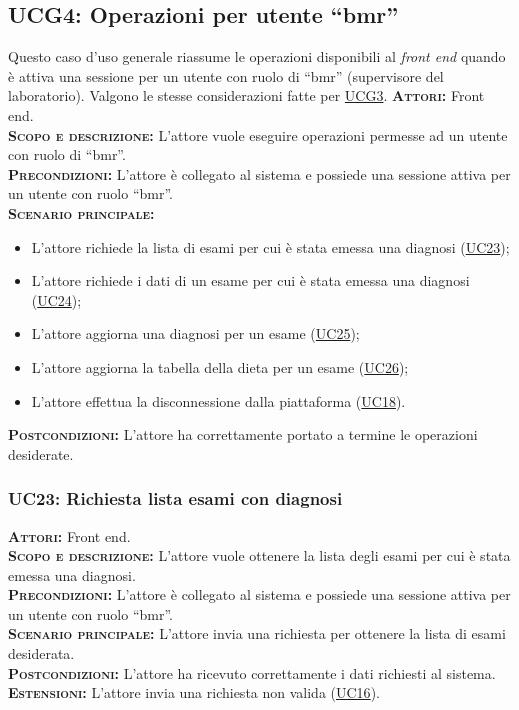 \subsection{UCG4: Operazioni per utente ``bmr''}
\label{sec:UCG4}
Questo caso d'uso generale riassume le operazioni disponibili al \textit{front end} quando è attiva una sessione per un utente con ruolo di ``bmr'' (supervisore del laboratorio). Valgono le stesse considerazioni fatte per \hyperref[sec:UCG3]{UCG3}.
\textsc{\textbf{Attori:}} Front end.\\
\textsc{\textbf{Scopo e descrizione:}} L'attore vuole eseguire operazioni permesse ad un utente con ruolo di ``bmr''.\\
\textsc{\textbf{Precondizioni:}} L'attore è collegato al sistema e possiede una sessione attiva per un utente con ruolo ``bmr''.\\
\textsc{\textbf{Scenario principale:}} 
\begin{itemize}
    \item L'attore richiede la lista di esami per cui è stata emessa una diagnosi (\hyperref[sec:UC23]{UC23});
    \item L'attore richiede i dati di un esame per cui è stata emessa una diagnosi (\hyperref[sec:UC24]{UC24});
    \item L'attore aggiorna una diagnosi per un esame (\hyperref[sec:UC25]{UC25});
    \item L'attore aggiorna la tabella della dieta per un esame (\hyperref[sec:UC26]{UC26});
    \item L'attore effettua la disconnessione dalla piattaforma (\hyperref[sec:UC18]{UC18}).
\end{itemize}
\textsc{\textbf{Postcondizioni:}} L'attore ha correttamente portato a termine le operazioni desiderate.

\subsubsection{UC23: Richiesta lista esami con diagnosi}
\label{sec:UC23}
\textsc{\textbf{Attori:}} Front end.\\
\textsc{\textbf{Scopo e descrizione:}} L'attore vuole ottenere la lista degli esami per cui è stata emessa una diagnosi.\\
\textsc{\textsc{\textbf{Precondizioni:}}} L'attore è collegato al sistema e possiede una sessione attiva per un utente con ruolo ``bmr''.\\
\textsc{\textbf{Scenario principale:}} L'attore invia una richiesta per ottenere la lista di esami desiderata.\\
\textsc{\textbf{Postcondizioni:}} L'attore ha ricevuto correttamente i dati richiesti al sistema.\\
\textsc{\textbf{Estensioni:}} L'attore invia una richiesta non valida (\hyperref[sec:UC16]{UC16}).

